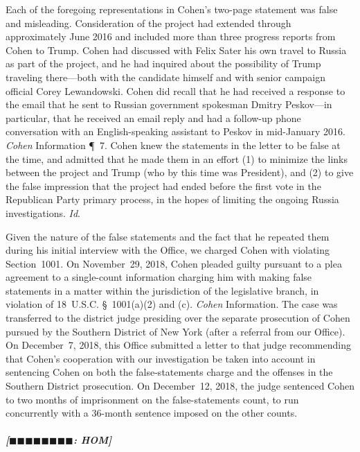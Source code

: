 Each of the foregoing representations in Cohen's two-page statement was false and misleading.
Consideration of the project had extended through approximately June 2016 and included more than three progress reports from Cohen to Trump.
Cohen had discussed with Felix Sater his own travel to Russia as part of the project, and he had inquired about the possibility of Trump traveling there---both with the candidate himself and with senior campaign official Corey Lewandowski.
Cohen did recall that he had received a response to the email that he sent to Russian government spokesman Dmitry Peskov---in particular, that he received an email reply and had a follow-up phone conversation with an English-speaking assistant to Peskov in mid-January 2016.
\textit{Cohen} Information \P~7.
Cohen knew the statements in the letter to be false at the time, and admitted that he made them in an effort (1) to minimize the links between the project and Trump (who by this time was President), and (2) to give the false impression that the project had ended before the first vote in the Republican Party primary process, in the hopes of limiting the ongoing Russia investigations.
\textit{Id}.

Given the nature of the false statements and the fact that he repeated them during his initial interview with the Office, we charged Cohen with violating Section~1001.
On November~29, 2018, Cohen pleaded guilty pursuant to a plea agreement to a single-count information charging him with making false statements in a matter within the jurisdiction of the legislative branch, in violation of 18~U.S.C. \S~1001(a)(2) and (c).
\textit{Cohen} Information.
The case was transferred to the district judge presiding over the separate prosecution of Cohen pursued by the Southern District of New York (after a referral from our Office).
On December~7, 2018, this Office submitted a letter to that judge recommending that Cohen's cooperation with our investigation be taken into account in sentencing Cohen on both the false-statements charge and the offenses in the Southern District prosecution.
On December~12, 2018, the judge sentenced Cohen to two months of imprisonment on the false-statements count, to run concurrently with a 36-month sentence imposed on the other counts.

\subparagraph{[$\blacksquare\blacksquare\blacksquare\blacksquare\blacksquare\blacksquare\blacksquare\blacksquare$: HOM]}


